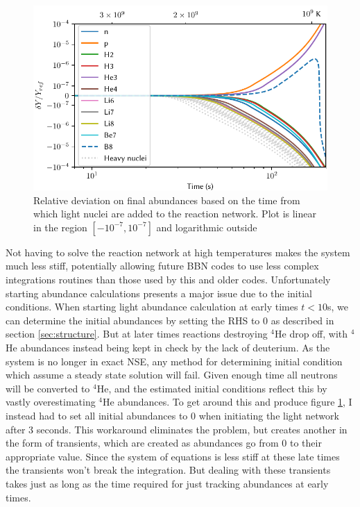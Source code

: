 \begin{figure}[ht]
    \includegraphics[width=5.1in]{figures/midnettime.pdf}
    \caption{Relative deviation on final abundances based on the time from which light nuclei are added to the reaction network. Plot is linear in the region $[-10^{-7},10^{-7}]$ and logarithmic outside}
    \label{fig:midnettime}
\end{figure}
Not having to solve the reaction network at high temperatures makes the system much less stiff, potentially allowing future BBN codes to use less complex integrations routines than those used by this and older codes. Unfortunately starting abundance calculations presents a major issue due to the initial conditions. When starting light abundance calculation at early times $t<10$s, we can determine the initial abundances by setting the RHS to 0 as described in section \ref{sec:structure}. But at later times reactions destroying ${}^4$He drop off, with ${}^4$He abundances instead being kept in check by the lack of deuterium. As the system is no longer in exact NSE, any method for determining initial condition which assume a steady state solution will fail. Given enough time all neutrons will be converted to ${}^4$He, and the estimated initial conditions reflect this by vastly overestimating ${}^4$He abundances. To get around this and produce figure \ref{fig:midnettime}, I instead had to set all initial abundances to 0 when initiating the light network after 3 seconds. This workaround eliminates the problem, but creates another in the form of transients, which are created as abundances go from 0 to their appropriate value. Since the system of equations is less stiff at these late times the transients won't break the integration. But dealing with these transients takes just as long as the time required for just tracking abundances at early times. 


